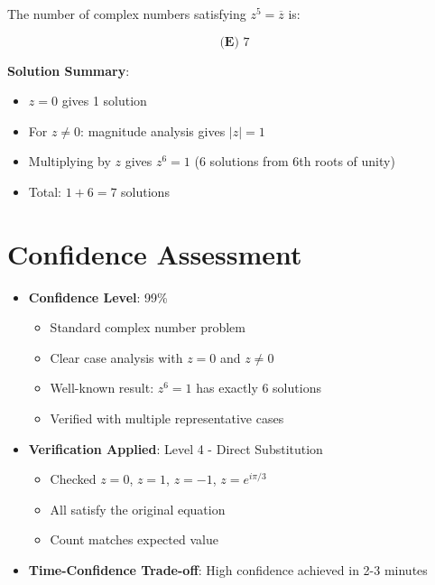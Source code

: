 \documentclass[11pt]{article}
\begin{document}
The number of complex numbers satisfying $z^5 = \overline{z}$ is:

\[\boxed{\textbf{(E) } 7}\]

\textbf{Solution Summary}:
\begin{itemize}
    \item $z = 0$ gives 1 solution
    \item For $z \neq 0$: magnitude analysis gives $|z| = 1$
    \item Multiplying by $z$ gives $z^6 = 1$ (6 solutions from 6th roots of unity)
    \item Total: $1 + 6 = 7$ solutions
\end{itemize}

\section*{Confidence Assessment}
\begin{itemize}[leftmargin=*]
    \item \textbf{Confidence Level}: 99\%
    \begin{itemize}
        \item Standard complex number problem
        \item Clear case analysis with $z = 0$ and $z \neq 0$
        \item Well-known result: $z^6 = 1$ has exactly 6 solutions
        \item Verified with multiple representative cases
    \end{itemize}
    \item \textbf{Verification Applied}: Level 4 - Direct Substitution
    \begin{itemize}
        \item Checked $z = 0$, $z = 1$, $z = -1$, $z = e^{i\pi/3}$
        \item All satisfy the original equation
        \item Count matches expected value
    \end{itemize}
    \item \textbf{Time-Confidence Trade-off}: High confidence achieved in 2-3 minutes
\end{itemize}
\end{document}
